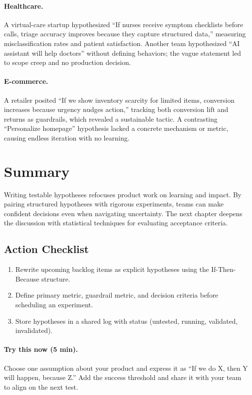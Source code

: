 \paragraph{Healthcare.} A virtual-care startup hypothesized ``If nurses receive symptom checklists before calls, triage accuracy improves because they capture structured data,'' measuring misclassification rates and patient satisfaction. Another team hypothesized ``AI assistant will help doctors'' without defining behaviors; the vague statement led to scope creep and no production decision.

\paragraph{E-commerce.} A retailer posited ``If we show inventory scarcity for limited items, conversion increases because urgency nudges action,'' tracking both conversion lift and returns as guardrails, which revealed a sustainable tactic. A contrasting ``Personalize homepage'' hypothesis lacked a concrete mechanism or metric, causing endless iteration with no learning.

\section{Summary}
\label{sec:hypotheses-summary}

Writing testable hypotheses refocuses product work on learning and impact. By pairing structured hypotheses with rigorous experiments, teams can make confident decisions even when navigating uncertainty. The next chapter deepens the discussion with statistical techniques for evaluating acceptance criteria.

\subsection{Action Checklist}
\begin{enumerate}
    \item Rewrite upcoming backlog items as explicit hypotheses using the If-Then-Because structure.
    \item Define primary metric, guardrail metric, and decision criteria before scheduling an experiment.
    \item Store hypotheses in a shared log with status (untested, running, validated, invalidated).
\end{enumerate}

\paragraph{Try this now (5 min).} Choose one assumption about your product and express it as ``If we do X, then Y will happen, because Z.'' Add the success threshold and share it with your team to align on the next test.

